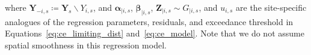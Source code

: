 \documentclass[12pt,compact]{article}
\begin{document}
where $\symbf{Y}_{-i, s} \coloneqq \symbf{Y}_{s} \backslash Y_{i, s}$, and $\symbf{\alpha}_{\mid i, s}$, $\symbf{\beta}_{\mid i, s}$, $\symbf{Z}_{\mid i, s} \sim G_{\mid i, s}$, and $u_{i, s}$ are the site-specific analogues of the regression parameters, residuals, and exceedance threshold in Equations~\eqref{eq:ce_limiting_dist} and~\eqref{eq:ce_model}.
Note that we do not assume spatial smoothness in this regression model.
\end{document}
